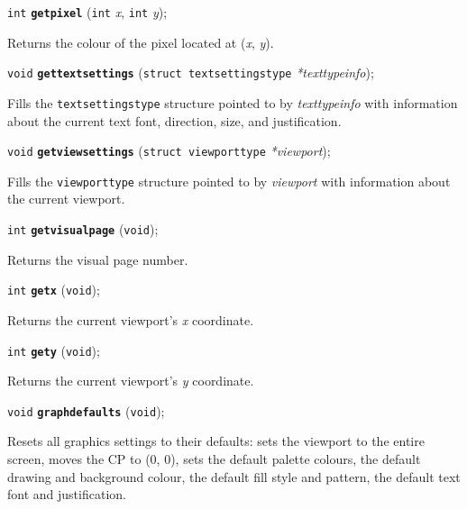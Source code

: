 \documentclass[a4paper,11pt]{article}
\newcommand{\V}{\texttt{void}}      %
\newcommand{\I}{\texttt{int}}       %
\newcommand{\func}[1]{\textbf{\texttt{#1}}}  %
\newcommand{\A}[1]{\emph{#1}}       %
\newenvironment{bgi}
{ %
  \begin{snugshade}
}
{ %
  \end{snugshade}
}
\begin{document}

\begin{bgi}
\I{} \func{getpixel} (\I{} \A{x}, \I{} \A{y});
\end{bgi}

Returns the colour of the pixel located at (\A{x}, \A{y}).


\begin{bgi}
\V{} \func{gettextsettings} (\texttt{struct textsettingstype}
\A{*texttypeinfo});
\end{bgi}

Fills the \texttt{textsettingstype} structure pointed to by
\A{texttypeinfo} with information about the current text font,
direction, size, and justification.


\begin{bgi}
\V{} \func{getviewsettings} (\texttt{struct viewporttype} \A{*viewport});
\end{bgi}

Fills the \texttt{viewporttype} structure pointed to by \A{viewport}
with information about the current viewport.


\begin{bgi}
\I{} \func{getvisualpage} (\V{});
\end{bgi}

Returns the visual page number.


\begin{bgi}
\I{} \func{getx} (\V{});
\end{bgi}

Returns the current viewport's \A{x} coordinate.


\begin{bgi}
\I{} \func{gety} (\V{});
\end{bgi}

Returns the current viewport's \A{y} coordinate.


\begin{bgi}
\V{} \func{graphdefaults} (\V{});
\end{bgi}

Resets all graphics settings to their defaults: sets the viewport to
the entire screen, moves the CP to (0, 0), sets the default palette
colours, the default drawing and background colour, the default fill
style and pattern, the default text font and justification.
\end{document}
